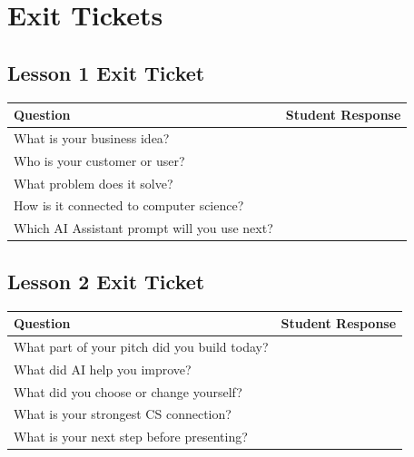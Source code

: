 \documentclass[11pt]{article}
\begin{document}
\section{Exit Tickets}
\subsection{Lesson 1 Exit Ticket}
\begin{tabularx}{\textwidth}{|>{\raggedright\arraybackslash}p{}|X|}
\hline
Question & Student Response \\
\hline
What is your business idea? & \\
\hline
Who is your customer or user? & \\
\hline
What problem does it solve? & \\
\hline
How is it connected to computer science? & \\
\hline
Which AI Assistant prompt will you use next? & \\
\hline
\end{tabularx}

\subsection{Lesson 2 Exit Ticket}
\begin{tabularx}{\textwidth}{|>{\raggedright\arraybackslash}p{}|X|}
\hline
Question & Student Response \\
\hline
What part of your pitch did you build today? & \\
\hline
What did AI help you improve? & \\
\hline
What did you choose or change yourself? & \\
\hline
What is your strongest CS connection? & \\
\hline
What is your next step before presenting? & \\
\hline
\end{tabularx}
\end{document}
